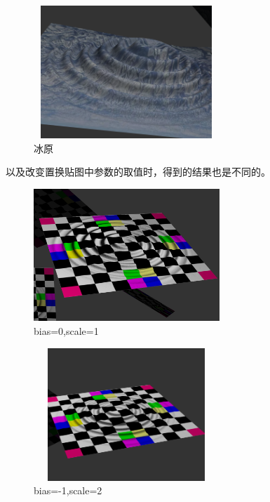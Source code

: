 \documentclass{article}
\begin{document}
\begin{figure}[H]
	\begin{center}
		
		\includegraphics[width=7cm,height=5cm]{bing1}
		
		\caption{冰原} \label{bingyuan1.label}
	\end{center}
\end{figure}

   以及改变置换贴图中参数的取值时，得到的结果也是不同的。
   
   \begin{figure}[H]
   	\begin{center}
   		
   		\includegraphics[width=7cm,height=5cm]{zhihuan 0 2}
   		
   		\caption{bias=0,scale=1} \label{zhihuan 0 2.label}
   	\end{center}
   \end{figure}

  \begin{figure}[H]
	\begin{center}
		
		\includegraphics[width=7cm,height=5cm]{zhihuan -1 2}
		
		\caption{bias=-1,scale=2} \label{zhihuan -1 2.label}
	\end{center}
\end{figure}
\end{document}
